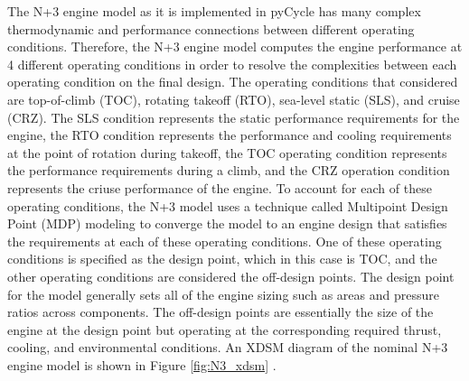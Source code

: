 \documentclass[conf]{new-aiaa}
\begin{document}
The N+3 engine model as it is implemented in pyCycle has many complex thermodynamic and performance connections between different operating conditions.
Therefore, the N+3 engine model computes the engine performance at 4 different operating conditions in order to resolve the complexities between each operating condition on the final design.
The operating conditions that considered are top-of-climb (TOC), rotating takeoff (RTO), sea-level static (SLS), and cruise (CRZ).
The SLS condition represents the static performance requirements for the engine, the RTO condition represents the performance and cooling requirements at the point of rotation during takeoff, the TOC operating condition represents the performance requirements during a climb, and the CRZ operation condition represents the criuse performance of the engine.
To account for each of these operating conditions, the N+3 model uses a technique called Multipoint Design Point (MDP) modeling to converge the model to an engine design that satisfies the requirements at each of these operating conditions.
One of these operating conditions is specified as the design point, which in this case is TOC, and the other operating conditions are considered the off-design points.
The design point for the model generally sets all of the engine sizing such as areas and pressure ratios across components.
The off-design points are essentially the size of the engine at the design point but operating at the corresponding required thrust, cooling, and environmental conditions.
An XDSM diagram of the nominal N+3 engine model is shown in Figure \ref{fig:N3_xdsm} \cite{Hendricks2019}.
\end{document}

